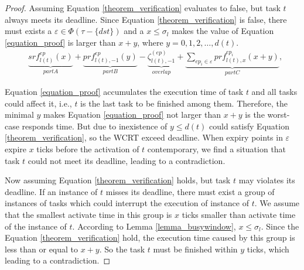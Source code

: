 \documentclass[sigconf]{acmart}
\begin{document}
\begin{proof}

  Assuming Equation \ref{theorem_verification} evaluates to false, but task $t$ always meets its deadline. Since Equation \ref{theorem_verification} is false, there must exists a $\varepsilon\in\Phi(\tau-\{dst\})$ and a $x\leq \sigma_l$ makes the value of Equation \ref{equation_proof} is larger than $x+y$, where $y=0,1,2,\dots,d(t)$.
  \begin{equation}\begin{split}
      &\underbrace{srf^{ep}_{l(t)}(x)}_{part A}+\underbrace{prf^{ep}_{l(t),-1}(y)}_{part B}-\underbrace{\zeta^{(ep)}_{l(t),-1}}_{overlap}+\underbrace{\sum\limits_{ep_i\in \varepsilon}prf^{ep_i}_{l(t),x}(x+y)}_{part C},
    \end{split}\label{equation_proof}\end{equation}
  
  Equation \ref{equation_proof} accumulates the execution time of task $t$ and all tasks could affect it, i.e., $t$ is the last task to be finished among them. Therefore, the minimal $y$ makes Equation \ref{equation_proof} not larger than $x+y$ is the worst-case responds time. But due to inexistence of $y\leq d(t)$ could satisfy Equation \ref{theorem_verification}, so the WCRT exceed deadline. When expiry points in $\varepsilon$ expire $x$ ticks before the activation of $t$ contemporary, we find a situation that task $t$ could not meet its deadline, leading to a contradiction. 
  
  Now assuming Equation \ref{theorem_verification} holds, but task $t$ may violates its deadline. If an instance of $t$ misses its deadline, there must exist a group of instances of tasks which could interrupt the execution of instance of $t$. We assume that the smallest activate time in this group is $x$ ticks smaller than activate time of the instance of $t$. According to Lemma \ref{lemma_busywindow}, $x\leq \sigma_l$. Since the Equation \ref{theorem_verification} hold, the execution time caused by this group is less than or equal to $x+y$. So the task $t$ must be finished within $y$ ticks, which leading to a contradiction.
\end{proof}

\end{document}
